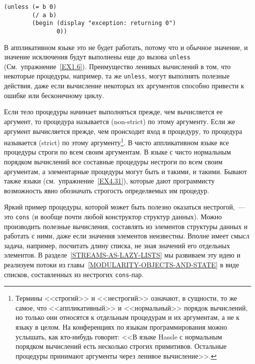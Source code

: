 \begin{Verbatim}[fontsize=\small]
(unless (= b 0)
        (/ a b)
        (begin (display "exception: returning 0")
               0))
\end{Verbatim}
В аппликативном языке это не будет работать, потому что и обычное
значение, и значение исключения будут выполнены еще до вызова {\tt unless} 
(См.~упражнение~\ref{EX1.6}).  Преимущество ленивых
вычислений в том, что некоторые процедуры, например, та же
{\tt unless}, могут выполнять полезные действия, даже если
вычисление некоторых их аргументов способно привести к ошибке или
бесконечному циклу.

Если тело процедуры начинает выполняться прежде, чем
вычисляется ее аргумент, то процедура называется 
 (non-strict)
по этому аргументу.  Если же
аргумент вычисляется прежде, чем происходит вход в процедуру, то
процедура называется  (strict)
по этому аргументу\footnote{Термины <<строгий>> и <<нестрогий>> означают, в
сущности, то же самое, что <<аппликативный>> и <<нормальный>> порядок
вычислений, но только они относятся к отдельным процедурам и их
аргументам, а не к языку в целом.  На конференциях по языкам
программирования можно услышать, как кто-нибудь говорит: <<В языке
Hassle
с нормальным порядком вычислений есть несколько строгих
примитивов.  Остальные процедуры принимают аргументы через ленивое
вычисление>>.}.
В чисто аппликативном языке все процедуры строги по всем своим
аргументам.  В языке с чисто нормальным порядком вычислений все
составные процедуры нестроги по всем своим аргументам, а элементарные
процедуры могут быть и такими, и такими.  Бывают также языки 
(см.~упражнение~\ref{EX4.31}), 
которые дают программисту возможность явно
обозначать строгость определяемых им процедур.

Яркий пример процедуры, которой может быть полезно
оказаться нестрогой,~--- это {\tt cons} (и вообще почти любой
конструктор структур данных).  Можно производить полезные вычисления,
составлять из элементов структуры данных и работать с ними, даже если
значения элементов неизвестны.  Вполне имеет смысл задача, например,
посчитать длину списка, не зная значений его отдельных элементов.  В
разделе~\ref{STREAMS-AS-LAZY-LISTS} мы развиваем эту идею
и реализуем потоки из главы~\ref{MODULARITY-OBJECTS-AND-STATE} в виде списков,
составленных из нестрогих {\tt cons}-пар.

